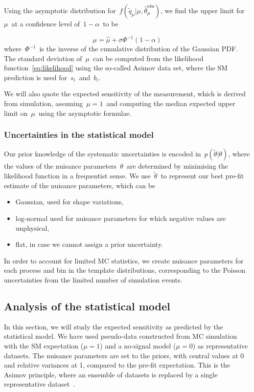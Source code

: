 Using the asymptotic distribution for~$f(\tilde{q}_\mu | \mu, \hat{\theta}_\mu^{\mathrm{obs}})$, we find the upper limit for~$\mu$~at a confidence level of~$1 - \alpha$~to be

\begin{equation}
\mu = \hat{\mu} + \sigma \Phi^{-1}(1 - \alpha)
\end{equation}
where~$\Phi^{-1}$~is the inverse of the cumulative distribution of the Gaussian PDF. The standard deviation of~$\mu$~can be computed from the likelihood function~\cref{eq:likelihood} using the so-called Asimov data set, where the SM prediction is used for~$s_i$~and~$b_i$.

We will also quote the expected sensitivity of the measurement, which is derived from simulation, assuming~$\mu = 1$~and computing the median expected upper limit on~$\mu$~using the asymptotic formulae. 

\subsubsection{Uncertainties in the statistical model}

Our prior knowledge of the systematic uncertainties is encoded in~$p(\tilde{\theta} | \theta)$, where the values of the nuisance parameters~$\theta$~are determined by minimising the likelihood function in a frequentist sense. We use~$\tilde{\theta}$~to represent our best pre-fit estimate of the nuisance parameters, which can be
\begin{itemize}
\item Gaussian, used for shape variations,
\item log-normal used for nuisance parameters for which negative values are unphysical,
\item flat, in case we cannot assign a prior uncertainty.
\end{itemize}
In order to account for limited MC statistics, we create nuisance parameters for each process and bin in the template distributions, corresponding to the Poisson uncertainties from the limited number of simulation events.

\subsection{Analysis of the statistical model}
\label{sec:model_analysis}
In this section, we will study the expected sensitivity as predicted by the statistical model. We have used pseudo-data constructed from MC simulation with the SM expectation ($\mu=1$) and a no-signal model ($\mu=0$) as representative datasets. The nuisance parameters are set to the priors, with central values at 0 and relative variances at 1, compared to the pre-fit expectation. This is the Asimov principle, where an ensemble of datasets is replaced by a single representative dataset~\cite{Cowan:2010js}.

